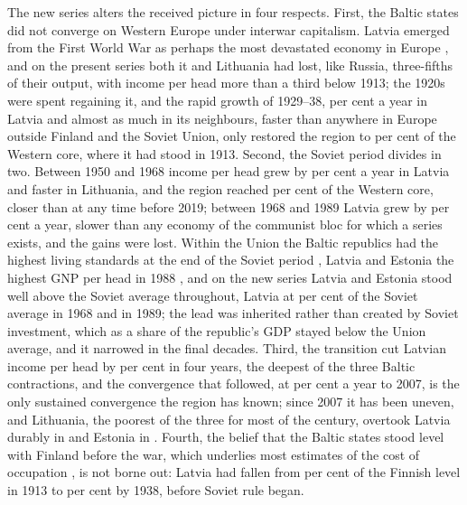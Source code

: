 The new series alters the received picture in four respects. First, the Baltic states did not converge on Western Europe under interwar capitalism. Latvia emerged from the First World War as perhaps the most devastated economy in Europe \parencites[44]{krumins_2024_makroekonomiska}[323]{norkusdvides}, and on the present series both it and Lithuania had lost, like Russia, three-fifths of their output, with income per head more than a third below 1913; the 1920s were spent regaining it, and the rapid growth of 1929--38,  per cent a year in Latvia and almost as much in its neighbours, faster than anywhere in Europe outside Finland and the Soviet Union, only restored the region to  per cent of the Western core, where it had stood in 1913. Second, the Soviet period divides in two. Between 1950 and 1968 income per head grew by  per cent a year in Latvia and faster in Lithuania, and the region reached  per cent of the Western core, closer than at any time before 2019; between 1968 and 1989 Latvia grew by  per cent a year, slower than any economy of the communist bloc for which a series exists, and the gains were lost. Within the Union the Baltic republics had the highest living standards at the end of the Soviet period \parencite[127]{hiden_salmon}, Latvia and Estonia the highest GNP per head in 1988 \parencite[35]{vanselm_1997_economics}, and on the new series Latvia and Estonia stood well above the Soviet average throughout, Latvia at  per cent of the Soviet average in 1968 and  in 1989; the lead was inherited rather than created by Soviet investment, which as a share of the republic's GDP stayed below the Union average, and it narrowed in the final decades. Third, the transition cut Latvian income per head by \lvTROUGHpct{} per cent in four years, the deepest of the three Baltic contractions, and the convergence that followed, at  per cent a year to 2007, is the only sustained convergence the region has known; since 2007 it has been uneven, and Lithuania, the poorest of the three for most of the century, overtook Latvia durably in \ltOVERTAKElv{} and Estonia in \ltOVERTAKEee{}. Fourth, the belief that the Baltic states stood level with Finland before the war, which underlies most estimates of the cost of occupation \parencites[60--2]{kalnins_2017_determining}[167--8]{kukk2005}[252]{viksnins_1986_latvian}, is not borne out: Latvia had fallen from  per cent of the Finnish level in 1913 to  per cent by 1938, before Soviet rule began.

